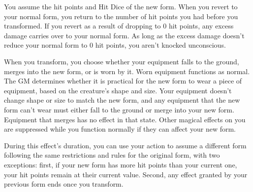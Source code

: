 You assume the hit points and Hit Dice of the new form. When you revert to your normal form, you return to the number of hit points you had before you transformed. If you revert as a result of dropping to 0 hit points, any excess damage carries over to your normal form. As long as the excess damage doesn't reduce your normal form to 0 hit points, you aren't knocked unconscious. 

When you transform, you choose whether your equipment falls to the ground, merges into the new form, or is worn by it. Worn equipment functions as normal. The GM determines whether it is practical for the new form to wear a piece of equipment, based on the creature's shape and size. Your equipment doesn't change shape or size to match the new form, and any equipment that the new form can't wear must either fall to the ground or merge into your new form. Equipment that merges has no effect in that state. Other magical effects on you are suppressed while you function normally if they can affect your new form.

During this effect's duration, you can use your action to assume a different form following the same restrictions and rules for the original form, with two exceptions: first, if your new form has more hit points than your current one, your hit points remain at their current value. Second, any effect granted by your previous form ends once you transform. 









